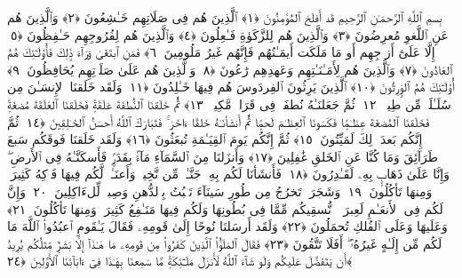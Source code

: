 
  
    
  
    
    

\nopagebreak
  بِسمِ ٱللَّهِ ٱلرَّحمَـٰنِ ٱلرَّحِيمِ
  قَد أَفلَحَ ٱلمُؤمِنُونَ ﴿١﴾
 ٱلَّذِينَ هُم فِى صَلَاتِهِم خَـٰشِعُونَ ﴿٢﴾
 وَٱلَّذِينَ هُم عَنِ ٱللَّغوِ مُعرِضُونَ ﴿٣﴾
 وَٱلَّذِينَ هُم لِلزَّكَوٰةِ فَـٰعِلُونَ ﴿٤﴾
 وَٱلَّذِينَ هُم لِفُرُوجِهِم حَـٰفِظُونَ ﴿٥﴾
 إِلَّا عَلَىٰٓ أَزوَٟجِهِم أَو مَا مَلَكَت أَيمَـٰنُهُم فَإِنَّهُم غَيرُ مَلُومِينَ ﴿٦﴾
 فَمَنِ ٱبتَغَىٰ وَرَآءَ ذَٟلِكَ فَأُو۟لَـٰٓئِكَ هُمُ ٱلعَادُونَ ﴿٧﴾
 وَٱلَّذِينَ هُم لِأَمَـٰنَـٰتِهِم وَعَهدِهِم رَٰعُونَ ﴿٨﴾
 وَٱلَّذِينَ هُم عَلَىٰ صَلَوَٟتِهِم يُحَافِظُونَ ﴿٩﴾
 أُو۟لَـٰٓئِكَ هُمُ ٱلوَٟرِثُونَ ﴿١٠﴾
 ٱلَّذِينَ يَرِثُونَ ٱلفِردَوسَ هُم فِيهَا خَـٰلِدُونَ ﴿١١﴾
 وَلَقَد خَلَقنَا ٱلإِنسَـٰنَ مِن سُلَـٰلَةٍۢ مِّن طِينٍۢ ﴿١٢﴾
 ثُمَّ جَعَلنَـٰهُ نُطفَةًۭ فِى قَرَارٍۢ مَّكِينٍۢ ﴿١٣﴾
 ثُمَّ خَلَقنَا ٱلنُّطفَةَ عَلَقَةًۭ فَخَلَقنَا ٱلعَلَقَةَ مُضغَةًۭ فَخَلَقنَا ٱلمُضغَةَ عِظَـٰمًۭا فَكَسَونَا ٱلعِظَـٰمَ لَحمًۭا ثُمَّ أَنشَأنَـٰهُ خَلقًا ءَاخَرَ ۚ فَتَبَارَكَ ٱللَّهُ أَحسَنُ ٱلخَـٰلِقِينَ ﴿١٤﴾
 ثُمَّ إِنَّكُم بَعدَ ذَٟلِكَ لَمَيِّتُونَ ﴿١٥﴾
 ثُمَّ إِنَّكُم يَومَ ٱلقِيَـٰمَةِ تُبعَثُونَ ﴿١٦﴾
 وَلَقَد خَلَقنَا فَوقَكُم سَبعَ طَرَآئِقَ وَمَا كُنَّا عَنِ ٱلخَلقِ غَٰفِلِينَ ﴿١٧﴾
 وَأَنزَلنَا مِنَ ٱلسَّمَآءِ مَآءًۢ بِقَدَرٍۢ فَأَسكَنَّـٰهُ فِى ٱلأَرضِ ۖ وَإِنَّا عَلَىٰ ذَهَابٍۭ بِهِۦ لَقَـٰدِرُونَ ﴿١٨﴾
 فَأَنشَأنَا لَكُم بِهِۦ جَنَّـٰتٍۢ مِّن نَّخِيلٍۢ وَأَعنَـٰبٍۢ لَّكُم فِيهَا فَوَٟكِهُ كَثِيرَةٌۭ وَمِنهَا تَأكُلُونَ ﴿١٩﴾
 وَشَجَرَةًۭ تَخرُجُ مِن طُورِ سَينَآءَ تَنۢبُتُ بِٱلدُّهنِ وَصِبغٍۢ لِّلءَاكِلِينَ ﴿٢٠﴾
 وَإِنَّ لَكُم فِى ٱلأَنعَـٰمِ لَعِبرَةًۭ ۖ نُّسقِيكُم مِّمَّا فِى بُطُونِهَا وَلَكُم فِيهَا مَنَـٰفِعُ كَثِيرَةٌۭ وَمِنهَا تَأكُلُونَ ﴿٢١﴾
 وَعَلَيهَا وَعَلَى ٱلفُلكِ تُحمَلُونَ ﴿٢٢﴾
 وَلَقَد أَرسَلنَا نُوحًا إِلَىٰ قَومِهِۦ فَقَالَ يَـٰقَومِ ٱعبُدُوا۟ ٱللَّهَ مَا لَكُم مِّن إِلَـٰهٍ غَيرُهُۥٓ ۖ أَفَلَا تَتَّقُونَ ﴿٢٣﴾
 فَقَالَ ٱلمَلَؤُا۟ ٱلَّذِينَ كَفَرُوا۟ مِن قَومِهِۦ مَا هَـٰذَآ إِلَّا بَشَرٌۭ مِّثلُكُم يُرِيدُ أَن يَتَفَضَّلَ عَلَيكُم وَلَو شَآءَ ٱللَّهُ لَأَنزَلَ مَلَـٰٓئِكَةًۭ مَّا سَمِعنَا بِهَـٰذَا فِىٓ ءَابَآئِنَا ٱلأَوَّلِينَ ﴿٢٤﴾
